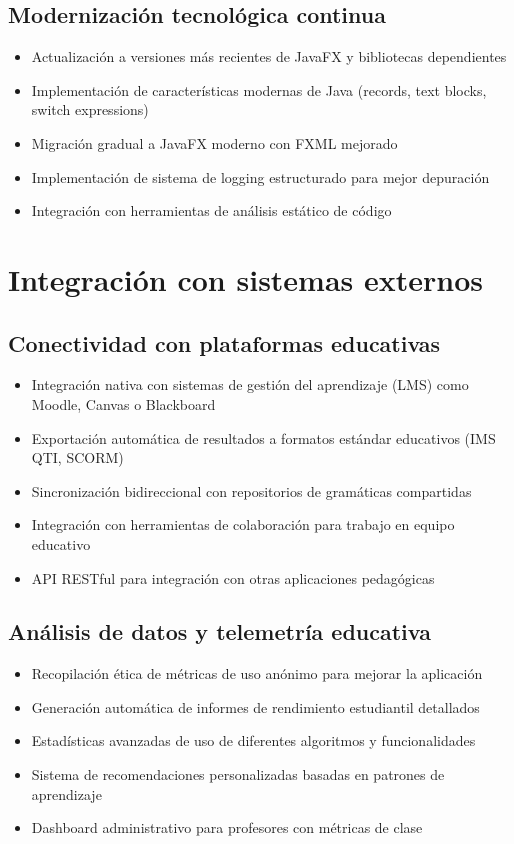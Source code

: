 \subsection{Modernización tecnológica continua}

\begin{itemize}
 \item Actualización a versiones más recientes de JavaFX y bibliotecas dependientes
 \item Implementación de características modernas de Java (records, text blocks, switch expressions)
 \item Migración gradual a JavaFX moderno con FXML mejorado
 \item Implementación de sistema de logging estructurado para mejor depuración
 \item Integración con herramientas de análisis estático de código
\end{itemize}

\section{Integración con sistemas externos}

\subsection{Conectividad con plataformas educativas}

\begin{itemize}
 \item Integración nativa con sistemas de gestión del aprendizaje (LMS) como Moodle, Canvas o Blackboard
 \item Exportación automática de resultados a formatos estándar educativos (IMS QTI, SCORM)
 \item Sincronización bidireccional con repositorios de gramáticas compartidas
 \item Integración con herramientas de colaboración para trabajo en equipo educativo
 \item API RESTful para integración con otras aplicaciones pedagógicas
\end{itemize}

\subsection{Análisis de datos y telemetría educativa}

\begin{itemize}
 \item Recopilación ética de métricas de uso anónimo para mejorar la aplicación
 \item Generación automática de informes de rendimiento estudiantil detallados
 \item Estadísticas avanzadas de uso de diferentes algoritmos y funcionalidades
 \item Sistema de recomendaciones personalizadas basadas en patrones de aprendizaje
 \item Dashboard administrativo para profesores con métricas de clase
\end{itemize}

